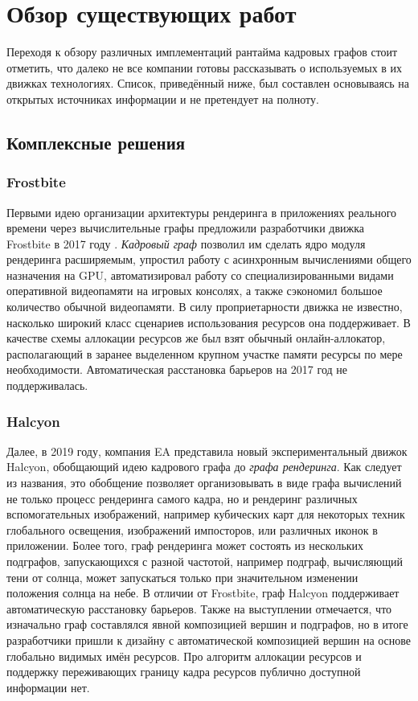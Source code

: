 \section{Обзор существующих работ}
Переходя к обзору различных имплементаций рантайма кадровых графов стоит отметить, что далеко не все компании готовы рассказывать о используемых в их движках технологиях. Список, приведённый ниже, был составлен основываясь на открытых источниках информации и не претендует на полноту.
\subsection{Комплексные решения}
\subsubsection*{Frostbite}
Первыми идею организации архитектуры рендеринга в приложениях реального времени через вычислительные графы предложили разработчики движка Frostbite в 2017 году \cite{FrostbiteGdcTalk}.
\textit{Кадровый граф} позволил им сделать ядро модуля рендеринга расширяемым, упростил работу с асинхронным вычислениями общего назначения на GPU, автоматизировал работу со специализированными видами оперативной видеопамяти на игровых консолях, а также сэкономил большое количество обычной видеопамяти.
В силу проприетарности движка не известно, насколько широкий класс сценариев использования ресурсов она поддерживает.
В качестве схемы аллокации ресурсов же был взят обычный онлайн-аллокатор, располагающий в заранее выделенном крупном участке памяти ресурсы по мере необходимости.
Автоматическая расстановка барьеров на 2017 год не поддерживалась.

\subsubsection*{Halcyon}
Далее, в 2019 году, компания EA представила \cite{HalcyonRapidInnovationTalk} новый экспериментальный движок Halcyon, обобщающий идею кадрового графа до \textit{графа рендеринга}.
Как следует из названия, это обобщение позволяет организовывать в виде графа вычислений не только процесс рендеринга самого кадра, но и рендеринг различных вспомогательных изображений, например кубических карт для некоторых техник глобального освещения, изображений импосторов, или различных иконок в приложении.
Более того, граф рендеринга может состоять из нескольких подграфов, запускающихся с разной частотой, например подграф, вычисляющий тени от солнца, может запускаться только при значительном изменении положения солнца на небе.
В отличии от Frostbite, граф Halcyon поддерживает автоматическую расстановку барьеров.
Также на выступлении отмечается, что изначально граф составлялся явной композицией вершин и подграфов, но в итоге разработчики пришли к дизайну с автоматической композицией вершин на основе глобально видимых имён ресурсов.
Про алгоритм аллокации ресурсов и поддержку переживающих границу кадра ресурсов публично доступной информации нет.

